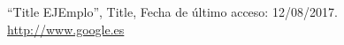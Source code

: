 

 ``Title EJEmplo'', Title, Fecha de último acceso: 12/08/2017.\\ \href{http://www.google.es/}{http://www.google.es}

